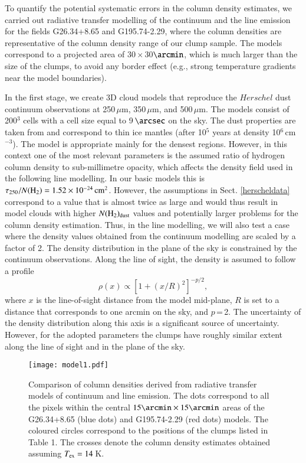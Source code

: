 \documentclass[printer]{aa}
\begin{document}
\begin{appendix}
To quantify the potential systematic errors in the column density estimates, we carried
out radiative transfer modelling of the continuum \citep[][Juvela in prep.]{juvela2003} and the line emission \citep{juvela1997} for the fields
G26.34+8.65 and G195.74-2.29, where the column densities are representative of the
column density range of our clump sample. The models correspond to a projected area of
30\,$\times$\,30$\arcmin$, which is much larger than the size of the clumps, to avoid
any border effect (e.g., strong temperature gradients near the model boundaries).

In the first stage, we create 3D cloud models that reproduce the $Herschel$ dust
continuum observations at 250\,$\mu$m, 350\,$\mu$m, and 500\,$\mu$m. The models consist
of 200$^3$ cells with a cell size equal to 9\,$\arcsec$ on the sky. The dust properties
are taken from \citet{ossenkopf1994} and correspond to thin ice mantles (after 10$^5$
years at density 10$^6$\,cm$^{-3}$). The model is appropriate mainly for the densest
regions. However, in this context one of the most relevant parameters is the assumed
ratio of hydrogen column density to sub-millimetre opacity, which affects the
density field used in the following line modelling. In our basic models this is
$\tau_{250}/N({\rm
H}_2)=1.52\times 10^{-24}\,{\rm cm}^2$. However, the assumptions in Sect. \ref{herscheldata} correspond to a value that
is almost twice as large and would thus result in model clouds with higher $N({\rm
H}_2)_{\rm dust}$ values and potentially larger problems for the column density estimation. Thus,
in the line modelling, we will also test a case where the density values obtained from
the continuum modelling are scaled by a factor of 2. The density distribution in the
plane of the sky is constrained by the continuum observations. Along the line of sight,
the density is assumed to follow a profile
\begin{equation}
\rho(x) \propto   \left[1+(x/R)^2 \right]^{-p/2},
\end{equation}
where $x$ is the line-of-sight distance from the model mid-plane, $R$ is set to a 
distance that corresponds to one arcmin on the sky, and $p$\,=\,2. The uncertainty of the
density distribution along this axis is a significant source of uncertainty. However,
for the adopted parameters the clumps have roughly similar extent along the line of sight
and in the plane of the sky.

\begin{figure}[tp]
\texttt{[image: model1.pdf]}
\caption{
% 
Comparison of column densities derived from radiative transfer models of continuum and line emission. The dots correspond to all the pixels within the central
$15\arcmin\times15\arcmin$ areas of the G26.34+8.65 (blue dots) and G195.74-2.29 (red dots) models. The coloured circles correspond to the positions of the clumps listed in Table 1. The crosses denote the column density estimates obtained assuming
$T_{\rm ex}=14$\,K.
%
}
\label{model1}
\end{figure}



\end{appendix}
\end{document}
